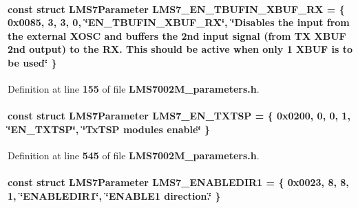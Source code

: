 \paragraph[{L\+M\+S7\+\_\+\+E\+N\+\_\+\+T\+B\+U\+F\+I\+N\+\_\+\+X\+B\+U\+F\+\_\+\+RX}]{\setlength{\rightskip}{0pt plus 5cm}const struct {\bf L\+M\+S7\+Parameter} L\+M\+S7\+\_\+\+E\+N\+\_\+\+T\+B\+U\+F\+I\+N\+\_\+\+X\+B\+U\+F\+\_\+\+RX = \{ 0x0085, 3, 3, 0, \char`\"{}\+E\+N\+\_\+\+T\+B\+U\+F\+I\+N\+\_\+\+X\+B\+U\+F\+\_\+\+R\+X\char`\"{}, \char`\"{}\+Disables the input from the external X\+O\+S\+C and buffers the 2nd input signal (from T\+X X\+B\+U\+F 2nd output) to the R\+X. This should be active when only 1 X\+B\+U\+F is to be used\char`\"{} \}\hspace{0.3cm}{\ttfamily [static]}}\label{LMS7002M__parameters_8h_ab90e3347aac952add5238a24e87798c0}


Definition at line {\bf 155} of file {\bf L\+M\+S7002\+M\+\_\+parameters.\+h}.

\paragraph[{L\+M\+S7\+\_\+\+E\+N\+\_\+\+T\+X\+T\+SP}]{\setlength{\rightskip}{0pt plus 5cm}const struct {\bf L\+M\+S7\+Parameter} L\+M\+S7\+\_\+\+E\+N\+\_\+\+T\+X\+T\+SP = \{ 0x0200, 0, 0, 1, \char`\"{}\+E\+N\+\_\+\+T\+X\+T\+S\+P\char`\"{}, \char`\"{}\+Tx\+T\+S\+P modules enable\char`\"{} \}\hspace{0.3cm}{\ttfamily [static]}}\label{LMS7002M__parameters_8h_ad7b78d544c62255f31c369eda20d692c}


Definition at line {\bf 545} of file {\bf L\+M\+S7002\+M\+\_\+parameters.\+h}.

\paragraph[{L\+M\+S7\+\_\+\+E\+N\+A\+B\+L\+E\+D\+I\+R1}]{\setlength{\rightskip}{0pt plus 5cm}const struct {\bf L\+M\+S7\+Parameter} L\+M\+S7\+\_\+\+E\+N\+A\+B\+L\+E\+D\+I\+R1 = \{ 0x0023, 8, 8, 1, \char`\"{}\+E\+N\+A\+B\+L\+E\+D\+I\+R1\char`\"{}, \char`\"{}\+E\+N\+A\+B\+L\+E1 direction.\char`\"{} \}\hspace{0.3cm}{\ttfamily [static]}}\label{LMS7002M__parameters_8h_a42e9d202c42786b2a5b35ffc794c1805}



